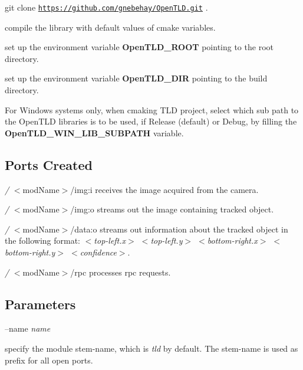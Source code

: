 \begin{DoxyEnumerate}
\item git clone \href{https://github.com/gnebehay/OpenTLD.git}{\tt https\+://github.\+com/gnebehay/\+Open\+T\+L\+D.\+git} .~\newline

\item compile the library with default values of cmake variables. ~\newline

\item set up the environment variable {\bfseries Open\+T\+L\+D\+\_\+\+R\+O\+O\+T} pointing to the root directory. ~\newline

\item set up the environment variable {\bfseries Open\+T\+L\+D\+\_\+\+D\+I\+R} pointing to the build directory. ~\newline

\item For Windows systems only, when cmaking T\+L\+D project, select which sub path to the Open\+T\+L\+D libraries is to be used, if Release (default) or Debug, by filling the {\bfseries Open\+T\+L\+D\+\_\+\+W\+I\+N\+\_\+\+L\+I\+B\+\_\+\+S\+U\+B\+P\+A\+T\+H} variable.
\end{DoxyEnumerate}\hypertarget{group__icub__tld_portsc_sec}{}\subsection{Ports Created}\label{group__icub__tld_portsc_sec}

\begin{DoxyItemize}
\item {\itshape /} $<$mod\+Name$>$/img\+:i receives the image acquired from the camera.
\item {\itshape /} $<$mod\+Name$>$/img\+:o streams out the image containing tracked object.
\item {\itshape /} $<$mod\+Name$>$/data\+:o streams out information about the tracked object in the following format\+: {\itshape $<$top-\/left.\+x$>$ $<$top-\/left.\+y$>$ $<$bottom-\/right.\+x$>$ $<$bottom-\/right.\+y$>$ $<$confidence$>$}.
\item {\itshape /} $<$mod\+Name$>$/rpc processes rpc requests.
\end{DoxyItemize}\hypertarget{group__icub__tld_parameters_sec}{}\subsection{Parameters}\label{group__icub__tld_parameters_sec}
--name {\itshape name} 
\begin{DoxyItemize}
\item specify the module stem-\/name, which is {\itshape tld} by default. The stem-\/name is used as prefix for all open ports.
\end{DoxyItemize}

